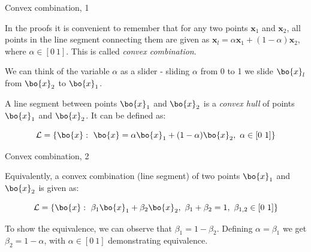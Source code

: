 \documentclass{beamer}
\begin{document}
\begin{frame}{Convex combination, 1}
	\begin{flushleft}
		
		
		In the proofs it is convenient to remember that for any two points $\mathbf{x}_1$ and $\mathbf{x}_2$, all points in the line segment connecting them are given as $\mathbf{x}_l = \alpha \mathbf{x}_1 + (1 - \alpha) \mathbf{x}_2$, where $\alpha \in [0 \ 1]$. This is called \emph{convex combination}.
		
		\bigskip
		
		We can think of the variable $\alpha$ as a slider - sliding $\alpha$ from 0 to 1 we slide $\bo{x}_l$ from $\bo{x}_2$ to $\bo{x}_1$.
		
		\bigskip
		
		A line segment between points $\bo{x}_1$ and $\bo{x}_2$ is a \emph{convex hull} of points $\bo{x}_1$ and $\bo{x}_2$. It can be defined as:
		
		\begin{equation}
			\mathcal{L} = \{  \bo{x}: \  \bo{x}=\alpha \bo{x}_1 + (1 - \alpha) \bo{x}_2, \   \alpha \in [0 \ 1] \}
		\end{equation}
		
	\end{flushleft}
\end{frame}




\begin{frame}{Convex combination, 2}
	\begin{flushleft}
		
		
		Equivalently, a convex combination (line segment) of two points $\bo{x}_1$ and $\bo{x}_2$ is given as:
		
		\begin{equation}
			\mathcal{L} = \{  \bo{x}: \  \beta_1 \bo{x}_1 + \beta_2 \bo{x}_2, \ \beta_1+\beta_2 = 1, \   \beta_{1, 2} \in [0 \ 1] \}
		\end{equation}
		
		To show the equivalence, we can observe that $\beta_1 = 1 - \beta_2$. Defining $\alpha = \beta_1$ we get $\beta_2 = 1 - \alpha$, with $\alpha \in [0 \ 1]$ demonstrating equivalence.
		
		
		
	\end{flushleft}
\end{frame}
\end{document}
